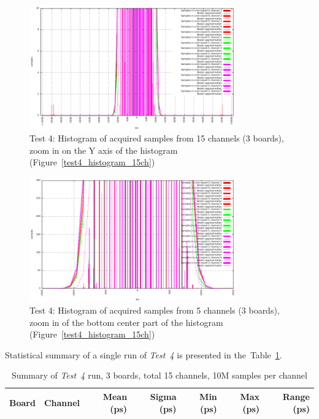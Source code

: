 \documentclass[a4paper, 12pt]{article}
\begin{document}
\begin{figure}[ht!]
  \centering
  \includegraphics[width=0.80\textwidth]{img/test4_histogram_15ch_zoomy.pdf}

  \caption{Test 4: Histogram of acquired samples from 15 channels (3 boards),
	  zoom in on the Y axis of the histogram
	  (Figure~\ref{test4_histogram_15ch})}
  \label{test4_histogram_15ch_zoomy}
\end{figure}

\begin{figure}[ht!]
  \centering
  \includegraphics[width=0.80\textwidth]{img/test4_histogram_15ch_zoomxy.pdf}
  \caption{Test 4: Histogram of acquired samples from 5 channels (3 boards),
	  zoom in of the bottom center part of the histogram
	  (Figure~\ref{test4_histogram_15ch})}
  \label{test4_histogram_15ch_zoomxy}
\end{figure}

\FloatBarrier

Statistical summary of a single run of \textit{Test~4} is presented in
the~Table~\ref{table_test4_summary}.

\begin{table}[!htb]
\centering
\footnotesize
  \begin{tabular}{|c|c|r|r|r|r|r|}
    \hline {\bf Board} & {\bf Channel} & {\bf Mean (ps)} & {\bf Sigma (ps)} & {\bf Min (ps)} & {\bf Max (ps)} & {\bf Range (ps)}  \\
    \hline
    
    \hline
  \end{tabular}
  \caption{Summary of \textit{Test~4} run, 3 boards, total 15 channels, 10M samples per channel}
  \label{table_test4_summary}
\end{table}
\end{document}
